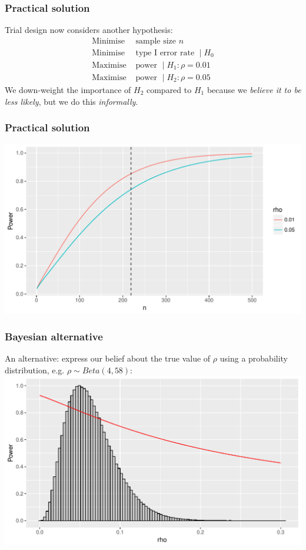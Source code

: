 \documentclass{beamer}
\begin{document}
\begin{frame}
\frametitle{Practical solution}
Trial design now considers another hypothesis:
\begin{align*}
\text{Minimise } & \text{sample size } n \\
\text{Minimise } & \text{type I error rate } \mid H_{0} \\
\text{Maximise } & \text{power } \mid H_{1}: \rho = 0.01 \\
\text{Maximise } & \text{power } \mid H_{2}: \rho = 0.05
\end{align*}
We down-weight the importance of $H_{2}$ compared to $H_{1}$ because we \emph{believe it to be less likely}, but we do this \emph{informally}.
\end{frame}

\begin{frame}
\frametitle{Practical solution}
\centering
\includegraphics[scale=0.6]{power_2ICCs}
\end{frame}

\begin{frame}
\frametitle{Bayesian alternative}
An alternative: express our belief about the true value of $\rho$ using a probability distribution, e.g. $\rho \sim Beta(4, 58)$:\\
\vspace{3mm}
\includegraphics[scale=0.5]{prior_ICC}
\end{frame}
\end{document}
